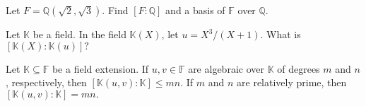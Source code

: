 \documentclass[addpoints,10pt]{exam}
\theoremstyle{plain}
\theoremstyle{definition}
\newtheorem{prob}[thm]{Problem}
\theoremstyle{plain}
\theoremstyle{plain}
\theoremstyle{definition}
\let\oldprob\prob
\let\endoldprob\endprob
\renewenvironment{prob}
  {\begin{singlespace}\oldprob}
  {\endoldprob\end{singlespace}}
\newcommand{\FF}{\ensuremath{\mathbb{F}}}
\newcommand{\KK}{\ensuremath{\mathbb{K}}}
\begin{document}
\newpage
\begin{prob}
Let $F = \mathbb{Q}(\sqrt{2}, \sqrt{3})$. Find $[F:\mathbb{Q}]$ and a basis of $\FF$ over $\mathbb{Q}$.
\end{prob}
\newpage
\begin{prob}
Let $\KK$ be a field. In the field $\KK(X)$, let $u=X^{3}/(X+1)$. What is $[\KK(X):\KK(u)]?$
\end{prob}
\newpage
\begin{prob}
Let $\KK\subseteq \FF$ be a field extension. If $u,v\in \FF$ are algebraic over $\KK$ of degrees $m$ and $n$, respectively, then $[\KK(u,v): \KK]\leq mn.$ If $m$ and $n$ are relatively prime, then $[\KK(u,v):\KK]=mn.$
\end{prob}
\newpage
\end{document}
